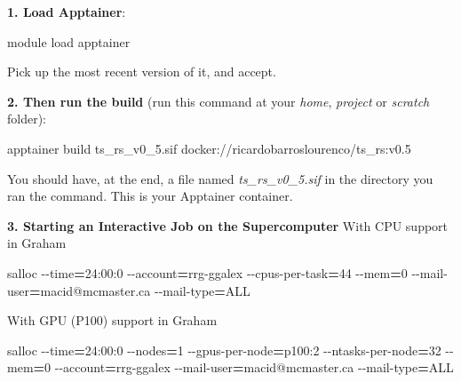 \documentclass[
]{book}
\newenvironment{Shaded}{\begin{snugshade}}{\end{snugshade}}
\newcommand{\AttributeTok}[1]{\textcolor[rgb]{0.77,0.63,0.00}{#1}}
\newcommand{\ExtensionTok}[1]{#1}
\newcommand{\NormalTok}[1]{#1}
\newcommand{\OperatorTok}[1]{\textcolor[rgb]{0.81,0.36,0.00}{\textbf{#1}}}
\begin{document}
\textbf{1. Load Apptainer}:

\begin{Shaded}
\begin{Highlighting}[]
\ExtensionTok{module}\NormalTok{ load apptainer}
\end{Highlighting}
\end{Shaded}

Pick up the most recent version of it, and accept.

\textbf{2. Then run the build} (run this command at your \emph{home}, \emph{project} or \emph{scratch} folder):

\begin{Shaded}
\begin{Highlighting}[]
\ExtensionTok{apptainer}\NormalTok{ build ts\_rs\_v0\_5.sif docker://ricardobarroslourenco/ts\_rs:v0.5}
\end{Highlighting}
\end{Shaded}

You should have, at the end, a file named \emph{ts\_rs\_v0\_5.sif} in the
directory you ran the command. This is your Apptainer container.

\textbf{3. Starting an Interactive Job on the Supercomputer}
With CPU support in Graham

\begin{Shaded}
\begin{Highlighting}[]
\ExtensionTok{salloc} \AttributeTok{{-}{-}time}\OperatorTok{=}\NormalTok{24:00:0 }\AttributeTok{{-}{-}account}\OperatorTok{=}\NormalTok{rrg{-}ggalex }\AttributeTok{{-}{-}cpus{-}per{-}task}\OperatorTok{=}\NormalTok{44 }\AttributeTok{{-}{-}mem}\OperatorTok{=}\NormalTok{0 }\AttributeTok{{-}{-}mail{-}user}\OperatorTok{=}\NormalTok{macid@mcmaster.ca }\AttributeTok{{-}{-}mail{-}type}\OperatorTok{=}\NormalTok{ALL}
\end{Highlighting}
\end{Shaded}

With GPU (P100) support in Graham

\begin{Shaded}
\begin{Highlighting}[]
\ExtensionTok{salloc} \AttributeTok{{-}{-}time}\OperatorTok{=}\NormalTok{24:00:0 }\AttributeTok{{-}{-}nodes}\OperatorTok{=}\NormalTok{1 }\AttributeTok{{-}{-}gpus{-}per{-}node}\OperatorTok{=}\NormalTok{p100:2 }\AttributeTok{{-}{-}ntasks{-}per{-}node}\OperatorTok{=}\NormalTok{32 }\AttributeTok{{-}{-}mem}\OperatorTok{=}\NormalTok{0 }\AttributeTok{{-}{-}account}\OperatorTok{=}\NormalTok{rrg{-}ggalex }\AttributeTok{{-}{-}mail{-}user}\OperatorTok{=}\NormalTok{macid@mcmaster.ca }\AttributeTok{{-}{-}mail{-}type}\OperatorTok{=}\NormalTok{ALL}
\end{Highlighting}
\end{Shaded}
\end{document}

